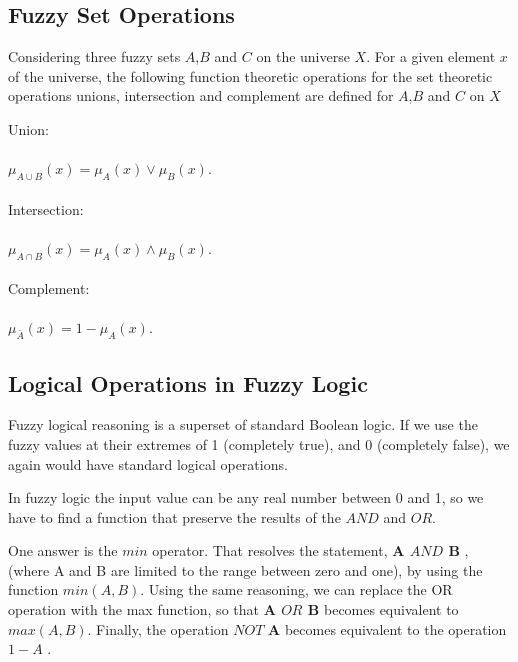 \documentclass{article}
\begin{document}
\subsection{Fuzzy Set Operations}
Considering three fuzzy sets $\mathit{A}$,$\mathit{B}$ and $\mathit{C}$ on the universe $\mathit{X}$. For a given element $\mathit{x}$ of the universe, the following function theoretic operations for the set theoretic operations unions, intersection and complement are defined for
$\mathit{A}$,$\mathit{B}$ and $\mathit{C}$ on $\mathit{X}$

Union:
\\
\\
$\mu_{A \cup B}  (x)= \mu_{A}(x) \vee  \mu_{B}(x).$ 
\\
\\
Intersection:
\\
\\
$\mu_{A \cap B}  (x)= \mu_{A}(x) \wedge  \mu_{B}(x).$ 
\\
\\
Complement:
\\
\\
$\mu_{\bar{A}}(x)= 1 -  \mu_{A}(x).$ 

\subsection{Logical Operations in Fuzzy Logic}
Fuzzy logical reasoning is a superset of standard Boolean logic. If we use the fuzzy values at their extremes of 1 (completely true), and 0 (completely false), we again would have standard logical operations.




In fuzzy logic the input value can be any real number  between 0 and 1, so we have to find 
a function that preserve the results of the $AND$ and $OR$.

One answer is the  $min$ operator. That resolves the statement, \textbf{A  $AND$ B },
(where A and B are limited to the range between zero and one), by using the function $min(A,B)$.
Using the same reasoning, we can replace the OR operation with the max
function, so that \textbf{A  $OR$ B} becomes equivalent to $max(A,B)$. Finally, the
operation $NOT$ \textbf{A} becomes equivalent to the operation $1 - A$ 
\citep{Fuzzy_Logic_Toolbox_For_Use_with_MATLAB}.
\end{document}
